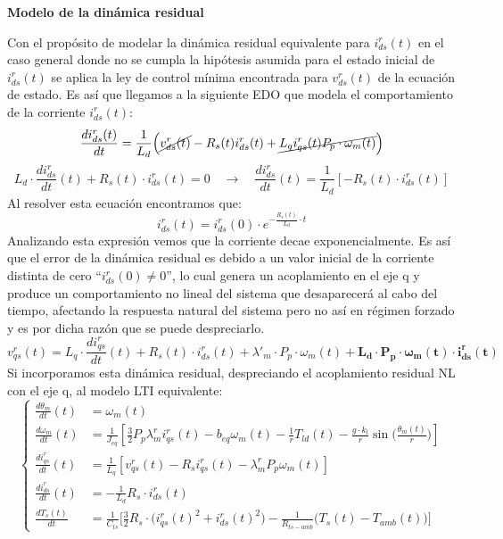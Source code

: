 \documentclass{article}
\begin{document}
\noindent\textbf{Modelo de la dinámica residual}

Con el propósito de modelar la dinámica residual equivalente para $i^r_{ds}(t)$ en el caso general donde no se cumpla la hipótesis asumida para el estado inicial de $i^r_{ds}(t)$ se aplica la ley de control mínima encontrada para $v^r_{ds}(t)$ de la ecuación de estado.
Es así que llegamos a la siguiente EDO que modela el comportamiento de la corriente $i^r_{ds}(t)$:
\begin{equation}
\frac{d i_{ds}^r(t)}{dt} = \frac{1}{L_d} \Big( \cancel{v_{ds}^r(t)} - R_s(t) i_{ds}^r(t) + \cancel{L_q i_{qs}^r(t) P_p \cdot \omega_m(t)} \Big)
\end{equation}
\begin{equation}
L_d \cdot\frac{di^r_{ds}}{dt}(t) + R_s(t)\cdot i^r_{ds}(t) = 0 \quad \rightarrow \quad \frac{di^r_{ds}}{dt}(t) = \frac{1}{L_d}\left[-R_s(t)\cdot i^r_{ds}(t)\right]
\end{equation}
Al resolver esta ecuación encontramos que:
\begin{equation}
i^r_{ds}(t) = i^r_{ds}(0)\cdot e^{-\frac{R_s(t)}{L_d}\cdot t}
\end{equation}
Analizando esta expresión vemos que la corriente decae exponencialmente. Es así que el error de la dinámica residual es debido a un valor inicial de la corriente distinta de cero ``$i^r_{ds}(0) \neq 0$'', lo cual genera un acoplamiento en el eje q y produce un comportamiento no lineal del sistema que desaparecerá al cabo del tiempo, afectando la respuesta natural del sistema pero no así en régimen forzado y es por dicha razón que se puede despreciarlo.
\begin{equation}
\label{eq:acoplamiento_residual_NL}
v^r_{qs}(t) = L_q\cdot \frac{di^r_{qs}}{dt}(t) + R_s(t)\cdot i^r_{ds}(t) + \lambda'_m\cdot P_p\cdot\omega_m(t) + \boldsymbol{L_d\cdot P_p\cdot\omega_m(t)\cdot i^r_{ds}(t)}
\end{equation}
Si incorporamos esta dinámica residual, despreciando el acoplamiento residual NL con el eje q, al modelo LTI equivalente:
\begin{equation}
\left\{
\begin{aligned}
\frac{d\theta_m}{dt}(t) &= \omega_m(t) \\[1ex]
\frac{d\omega_m}{dt}(t) &= \frac{1}{J_{eq}}\left[\frac{3}{2}P_p\lambda^r_mi^r_{qs}(t) - b_{eq}\omega_m(t) - \frac{1}{r}T_{ld}(t) - \frac{g \cdot k_l}{r} \sin\Bigg(\frac{\theta_m(t)}{r}\Bigg)\right] \\[1ex]
\frac{di^r_{qs}}{dt}(t) &= \frac{1}{L_q}\left[v^r_{qs}(t) - R_si^r_{qs}(t) - \lambda^r_mP_p\omega_m(t)\right] \\[1ex]
\frac{di^r_{ds}}{dt}(t) &= -\frac{1}{L_d}R_s\cdot i^r_{ds}(t) \\[1ex]
\frac{d T_s(t)}{dt} &= \frac{1}{C_{ts}} \Bigg[ \frac{3}{2} R_s \cdot \big(i_{qs}^r(t)^2+i_{ds}^r(t)^2\big) - \frac{1}{R_{ts-amb}} \big( T_s(t) - T_{amb}(t) \big) \Bigg]
\end{aligned}
\right.
\label{eq:sistema_LTI_aumentado}
\end{equation}
\end{document}
